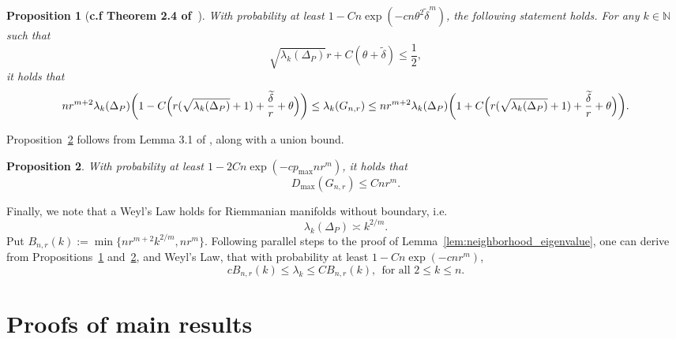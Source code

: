 \documentclass[twoside]{article}
\newcommand{\1}{\mathbf{1}}
\newcommand{\wt}[1]{\widetilde{#1}}
\newtheorem{proposition}{Proposition}
\theoremstyle{definition}
\theoremstyle{remark}
\begin{document}
\begin{proposition}[\textbf{c.f Theorem 2.4 of~\citet{calder2019}}]
	\label{prop:calder19_1}
	With probability at least $1 - Cn\exp(-cn\theta^2\wt{\delta}^m)$, the following statement holds. For any $k \in \mathbb{N}$ such that
	\begin{equation*}
	\sqrt{\lambda_k(\Delta_P)}r + C(\theta + \wt{\delta}) \leq \frac{1}{2},
	\end{equation*} 
	it holds that
	\begin{equation*}
	nr^{m+2} \lambda_k(\Delta_P) \biggl(1 - C\Bigl(r(\sqrt{\lambda_k(\Delta_P)} + 1) + \frac{\wt{\delta}}{r} + \theta\Bigr)\biggr)\leq \lambda_k(G_{n,r}) \leq nr^{m+2} \lambda_k(\Delta_P) \biggl(1 + C\Bigl(r(\sqrt{\lambda_k(\Delta_P)} + 1) + \frac{\wt{\delta}}{r} + \theta\Bigr)\biggr).
	\end{equation*}
\end{proposition}

Proposition~\ref{prop:calder19_2} follows from Lemma 3.1 of \citet{calder2019}, along with a union bound.
\begin{proposition}
	\label{prop:calder19_2}
	With probability at least $1 - 2Cn\exp(-cp_{\max}nr^m)$, it holds that
	\begin{equation*}
	D_{\max}(G_{n,r}) \leq Cnr^{m}.
	\end{equation*}
\end{proposition}

Finally, we note that a Weyl's Law holds for Riemmanian manifolds without boundary, i.e.
\begin{equation*}
\lambda_k(\Delta_P) \asymp k^{2/m}.
\end{equation*}
Put $B_{n,r}(k) := \min\{nr^{m + 2}k^{2/m}, nr^m\}$. Following parallel steps to the proof of Lemma~\ref{lem:neighborhood_eigenvalue}, one can derive from Propositions~\ref{prop:calder19_1} and~\ref{prop:calder19_2}, and Weyl's Law, that with probability at least $1 - Cn\exp(-cnr^m)$, 
\begin{equation}
\label{eqn:neighborhood_eigenvalue_manifold}
cB_{n,r}(k) \leq \lambda_k \leq CB_{n,r}(k),~~\textrm{for all $2 \leq k \leq n$}.
\end{equation}

\section{Proofs of main results}
\label{sec:main_results}
\end{document}
